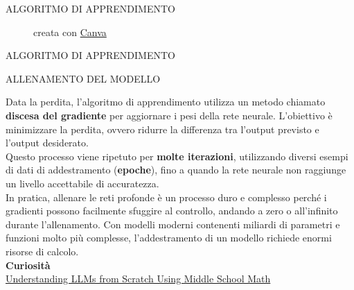 \documentclass[aspectratio=1610]{beamer}
\begin{document}
\begin{frame}{ALGORITMO DI APPRENDIMENTO}
{\begin{figure}
        \caption{{creata con \href{www.canva.com}{Canva}}}
    \end{figure}}
\end{frame}

\begin{frame}{ALGORITMO DI APPRENDIMENTO}
    \begin{alertblock}{ALLENAMENTO DEL MODELLO}
        \begin{minipage}{0.98\linewidth}
            \justifying
            Data la perdita, l'algoritmo di apprendimento utilizza un metodo chiamato 
            \textbf{discesa del gradiente} per aggiornare i pesi della rete neurale. 
            L'obiettivo è minimizzare la perdita, ovvero ridurre la differenza tra 
            l'output previsto e l'output desiderato.\\
            Questo processo viene ripetuto per \textbf{molte iterazioni}, utilizzando diversi 
            esempi di dati di addestramento (\textbf{epoche}), fino a quando la rete neurale non raggiunge 
            un livello accettabile di accuratezza.\\
            In pratica, allenare le reti profonde è un processo duro e complesso perché i 
            gradienti possono facilmente sfuggire al controllo, andando a zero o all'infinito durante 
            l'allenamento. Con modelli moderni contenenti miliardi di parametri e funzioni molto più complesse, 
            l'addestramento di un modello richiede enormi risorse di calcolo.\\
            \bigskip
            \tiny{\textbf{Curiosità}}\\
            \tiny{\href{https://towardsdatascience.com/understanding-llms-from-scratch-using-middle-school-math-e602d27ec876/}{Understanding LLMs from Scratch Using Middle School Math}}
        \end{minipage}
    \end{alertblock}
\end{frame}
\end{document}
